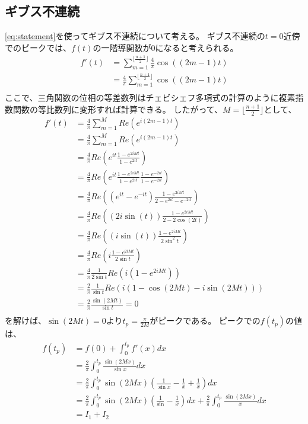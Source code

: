 \documentclass{jsarticle}
\begin{document}
\subsection{ギブス不連続}
\eqref{eq:statement}を使ってギブス不連続について考える。
ギブス不連続の$t=0$近傍でのピークでは、$f(t)$の一階導関数が$0$になると考えられる。
\begin{align}
    f'(t)&= \sum^{\lfloor \frac{n+1}{2}\rfloor}_{m=1}
    \frac{4}{\pi}\cos((2m-1)t)\\
    &= \frac{4}{\pi}\sum^{\lfloor \frac{n+1}{2}\rfloor}_{m=1}
    \cos((2m-1)t)\\
\end{align}
ここで、三角関数の位相の等差数列はチェビシェフ多項式の計算のように複素指数関数の等比数列に変形すれば計算できる。
したがって、$M=\lfloor \frac{n+1}{2}\rfloor$として、
\begin{align}
    f'(t)&= \frac{4}{\pi}\sum^{M}_{m=1}
    Re\left(e^{i(2m-1)t}\right)\\
    &= \frac{4}{\pi}\sum^{M}_{m=1}
    Re\left(e^{i(2m-1)t}\right)\\
    &= \frac{4}{\pi}
    Re\left(e^{it}\frac{1 - e^{2iMt}}{1 - e^{2it}}\right)\\
    &= \frac{4}{\pi}
    Re\left(e^{it}\frac{1 - e^{2iMt}}{1 - e^{2it}}\frac{1 - e^{-2it}}{1 - e^{-2it}}\right)\\
    &= \frac{4}{\pi}
    Re\left((e^{it} - e^{-it})\frac{1 - e^{2iMt}}{2 - e^{2it}- e^{-2it}}\right)\\
    &= \frac{4}{\pi}
    Re\left((2i\sin(t))\frac{1 - e^{2iMt}}{2 - 2\cos(2t)}\right)\\
    &= \frac{4}{\pi}
    Re\left((i\sin(t))\frac{1 - e^{2iMt}}{2\sin^2t}\right)\\
    &= \frac{4}{\pi}
    Re\left(i\frac{1 - e^{2iMt}}{2\sin t}\right)\\
    &= \frac{4}{\pi}\frac{1}{2\sin t}
    Re\left(i(1 - e^{2iMt})\right)\\
    &= \frac{2}{\pi}\frac{1}{\sin t}
    Re\left(i(1 - \cos (2Mt) -i \sin (2Mt))\right)\\
    &= \frac{2}{\pi}\frac{\sin (2Mt)}{\sin t} = 0\\
\end{align}
を解けば、$\sin (2Mt) = 0$より$t_p = \frac{\pi}{2M}$がピークである。
ピークでの$f(t_p)$の値は、
\begin{align}
    f(t_p) &= f(0) + \int^{t_p}_0 f'(x) dx\\
    &= \frac{2}{\pi}\int^{t_p}_0 \frac{\sin (2Mx)}{\sin x} dx\\
    &= \frac{2}{\pi}\int^{t_p}_0 \sin (2Mx)\left(\frac{1}{\sin x} - \frac{1}{x} + \frac{1}{x}\right) dx\\
    &= \frac{2}{\pi}\int^{t_p}_0 
    \sin (2Mx)
    \left(\frac{1}{\sin } - \frac{1}{x}\right) dx
    +\frac{2}{\pi}\int^{t_p}_0 
    \frac{\sin (2Mx)}{x} dx\\
    &= I_1 + I_2
\end{align}
\end{document}
